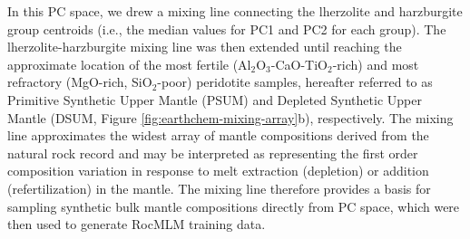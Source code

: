 \documentclass[draft,linenumbers]{agujournal2018}
\begin{document}
In this PC space, we drew a mixing line connecting the lherzolite and harzburgite group centroids (i.e., the median values for PC1 and PC2 for each group). The lherzolite-harzburgite mixing line was then extended until reaching the approximate location of the most fertile (Al\(_2\)O\(_3\)-CaO-TiO\(_2\)-rich) and most refractory (MgO-rich, SiO\(_2\)-poor) peridotite samples, hereafter referred to as Primitive Synthetic Upper Mantle (PSUM) and Depleted Synthetic Upper Mantle (DSUM, Figure \ref{fig:earthchem-mixing-array}b), respectively. The mixing line approximates the widest array of mantle compositions derived from the natural rock record and may be interpreted as representing the first order composition variation in response to melt extraction (depletion) or addition (refertilization) in the mantle. The mixing line therefore provides a basis for sampling synthetic bulk mantle compositions directly from PC space, which were then used to generate RocMLM training data.
\end{document}
